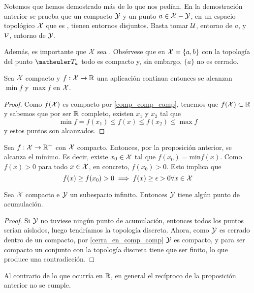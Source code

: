 \begin{obs}\label{T6:obs_compacto y punto en t2 disjuntos}
	Notemos que hemos demostrado más de lo que nos pedían. En la demostración anterior se prueba que un compacto $\mathcal{Y}$ y un punto $a\in \mathcal{X}-\mathcal{Y}$, en un espacio topológico $\mathcal{X}$ que es \hausdorff, tienen entornos disjuntos. Basta tomar $\mathcal{U}$, entorno de $a$, y $\mathcal{V}$, entorno de $\mathcal{Y}$.
	
	Además, es importante que $\mathcal{X}$ sea \hausdorff. Obsérvese que en $\mathcal{X}=\{a,b\}$ con la topología del punto $\T_a$ todo es compacto y, sin embargo, $\{a\}$ no es cerrado.
\end{obs}

\begin{prop}\label{T6:prop_alcanza maximo y minimo}
	Sea $\mathcal{X}$ compacto y $f:\mathcal{X} \rightarrow \mathbb{R}$ una aplicación continua entonces se alcanzan $\min f$ y $\max f$ en $\mathcal{X}$.
	\begin{proof}
		Como $f(\mathcal{X})$ es compacto por \ref{comp_comp_comp}, tenemos que $f(\mathcal{X}) \subset \mathbb{R}$ y sabemos que por ser $\mathbb{R}$ completo, existen $x_1$ y $x_2$ tal que
		\begin{equation*}
			\min f = f(x_1) \leq f(x) \leq f(x_2) \leq \max f
		\end{equation*}
		y estos puntos son alcanzados.
	\end{proof}
\end{prop}

\begin{obs}
	Sea $f:\mathcal{X}\rightarrow \mathbb{R}^+$ con $\mathcal{X}$ compacto. Entonces, por la proposición anterior, se alcanza el mínimo. Es decir, existe $x_0\in\mathcal{X}$ tal que $f(x_0)=\text{min} f(x)$. Como $f(x)>0$ para todo $x\in\mathcal{X}$, en concreto, $f(x_0)>0$. Esto implica que
	\[ f(x)\ge f(x_0)>0\implies f(x)\ge \epsilon>0 \forall x\in\mathcal{X} \]
\end{obs}

\begin{prop}
		Sea $\mathcal{X}$ compacto e $\mathcal{Y}$ un subespacio infinito. Entonces $\mathcal{Y}$ tiene algún punto de acumulación.
	\begin{proof}
		Si $\mathcal{Y}$ no tuviese ningún punto de acumulación, entonces todos los puntos serían aislados, luego tendríamos la topología discreta. Ahora, como $\mathcal{Y}$ es cerrado dentro de un compacto, por \ref{cerra_en_comp_comp} $\mathcal{Y}$ es compacto, y para ser compacto un conjunto con la topología discreta tiene que ser finito, lo que produce una contradicción.
	\end{proof}
\end{prop}

\begin{obs}
	Al contrario de lo que ocurría en $\mathbb{R}$, en general el recíproco de la proposición anterior no se cumple. 
\end{obs}

